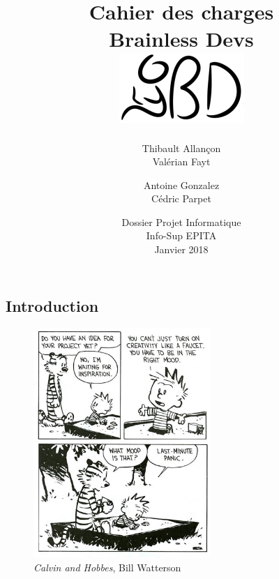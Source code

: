 \documentclass[12pt]{report}
\begin{document}
\begin{titlepage}

\title{
	{\Huge Cahier des charges}\\
	{\large Brainless Devs}\\
	{\vspace{2em}\includegraphics[center]{logo_short.png}}
}
\author{
	Thibault Allançon\\
	Valérian Fayt
	\and
	Antoine Gonzalez\\
	Cédric Parpet}
\date{
	\vfill 
	Dossier Projet Informatique\\
	Info-Sup EPITA\\
	Janvier 2018
}

\maketitle

\tableofcontents

\chapter{Introduction}

\begin{figure}
\centering
\includegraphics[width=0.6\textwidth]{project_mood}
\caption*{\textit{Calvin and Hobbes}, Bill Watterson}
\end{figure}


\end{titlepage}
\end{document}
